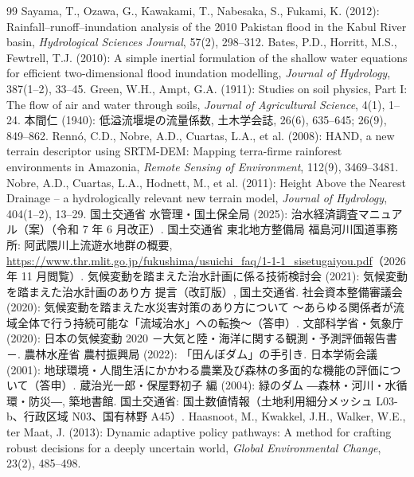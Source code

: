 \documentclass[a4paper,10pt]{ltjsarticle}
\begin{document}
\begin{thebibliography}{99}\small
{} Sayama, T., Ozawa, G., Kawakami, T., Nabesaka, S., Fukami, K. (2012): Rainfall–runoff–inundation analysis of the 2010 Pakistan flood in the Kabul River basin, \textit{Hydrological Sciences Journal}, 57(2), 298--312.
 Bates, P.D., Horritt, M.S., Fewtrell, T.J. (2010): A simple inertial formulation of the shallow water equations for efficient two-dimensional flood inundation modelling, \textit{Journal of Hydrology}, 387(1--2), 33--45.
 Green, W.H., Ampt, G.A. (1911): Studies on soil physics, Part I: The flow of air and water through soils, \textit{Journal of Agricultural Science}, 4(1), 1--24.
 本間仁 (1940): 低溢流堰堤の流量係数, 土木学会誌, 26(6), 635--645; 26(9), 849--862.
 Rennó, C.D., Nobre, A.D., Cuartas, L.A., et al. (2008): HAND, a new terrain descriptor using SRTM-DEM: Mapping terra-firme rainforest environments in Amazonia, \textit{Remote Sensing of Environment}, 112(9), 3469--3481.
 Nobre, A.D., Cuartas, L.A., Hodnett, M., et al. (2011): Height Above the Nearest Drainage -- a hydrologically relevant new terrain model, \textit{Journal of Hydrology}, 404(1--2), 13--29.
 国土交通省 水管理・国土保全局 (2025): 治水経済調査マニュアル（案）（令和 7 年 6 月改正）.
 国土交通省 東北地方整備局 福島河川国道事務所: 阿武隈川上流遊水地群の概要, \url{https://www.thr.mlit.go.jp/fukushima/usuichi_faq/1-1-1_sisetugaiyou.pdf}（2026 年 11 月閲覧）.
 気候変動を踏まえた治水計画に係る技術検討会 (2021): 気候変動を踏まえた治水計画のあり方 提言（改訂版）, 国土交通省.
 社会資本整備審議会 (2020): 気候変動を踏まえた水災害対策のあり方について ～あらゆる関係者が流域全体で行う持続可能な「流域治水」への転換～（答申）.
 文部科学省・気象庁 (2020): 日本の気候変動 2020 －大気と陸・海洋に関する観測・予測評価報告書－.
 農林水産省 農村振興局 (2022): 「田んぼダム」の手引き.
 日本学術会議 (2001): 地球環境・人間生活にかかわる農業及び森林の多面的な機能の評価について（答申）.
 蔵治光一郎・保屋野初子 編 (2004): 緑のダム ―森林・河川・水循環・防災―, 築地書館.
 国土交通省: 国土数値情報（土地利用細分メッシュ L03-b、行政区域 N03、国有林野 A45）.
 Haasnoot, M., Kwakkel, J.H., Walker, W.E., ter Maat, J. (2013): Dynamic adaptive policy pathways: A method for crafting robust decisions for a deeply uncertain world, \textit{Global Environmental Change}, 23(2), 485--498.

\end{thebibliography}
\end{document}

